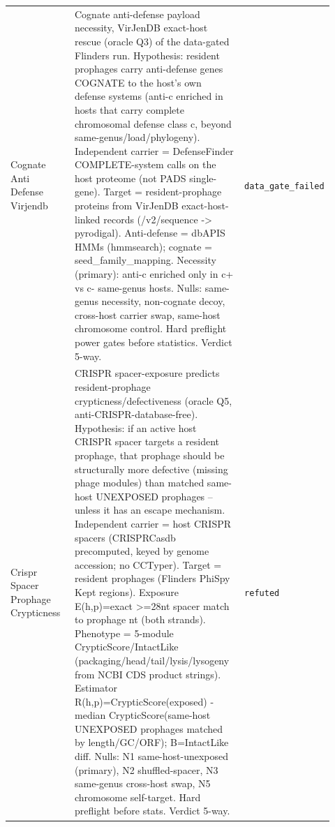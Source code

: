 \begin{longtable}{>{\raggedright\arraybackslash}p{0.22\linewidth}>{\raggedright\arraybackslash}p{0.55\linewidth}>{\raggedright\arraybackslash}p{0.15\linewidth}}
Cognate Anti Defense Virjendb & Cognate anti-defense payload necessity, VirJenDB exact-host rescue (oracle Q3) of the data-gated Flinders run. Hypothesis: resident prophages carry anti-defense genes COGNATE to the host's own defense systems (anti-c enriched in hosts that carry complete chromosomal defense class c, beyond same-genus/load/phylogeny). Independent carrier = DefenseFinder COMPLETE-system calls on the host proteome (not PADS single-gene). Target = resident-prophage proteins from VirJenDB exact-host-linked records (/v2/sequence -> pyrodigal). Anti-defense = dbAPIS HMMs (hmmsearch); cognate = seed\_family\_mapping. Necessity (primary): anti-c enriched only in c+ vs c- same-genus hosts. Nulls: same-genus necessity, non-cognate decoy, cross-host carrier swap, same-host chromosome control. Hard preflight power gates before statistics. Verdict 5-way. & \texttt{data\_gate\_failed} \\
Crispr Spacer Prophage Crypticness & CRISPR spacer-exposure predicts resident-prophage crypticness/defectiveness (oracle Q5, anti-CRISPR-database-free). Hypothesis: if an active host CRISPR spacer targets a resident prophage, that prophage should be structurally more defective (missing phage modules) than matched same-host UNEXPOSED prophages -- unless it has an escape mechanism. Independent carrier = host CRISPR spacers (CRISPRCasdb precomputed, keyed by genome accession; no CCTyper). Target = resident prophages (Flinders PhiSpy Kept regions). Exposure E(h,p)=exact >=28nt spacer match to prophage nt (both strands). Phenotype = 5-module CrypticScore/IntactLike (packaging/head/tail/lysis/lysogeny from NCBI CDS product strings). Estimator R(h,p)=CrypticScore(exposed) - median CrypticScore(same-host UNEXPOSED prophages matched by length/GC/ORF); B=IntactLike diff. Nulls: N1 same-host-unexposed (primary), N2 shuffled-spacer, N3 same-genus cross-host swap, N5 chromosome self-target. Hard preflight before stats. Verdict 5-way. & \texttt{refuted} \\

\end{longtable}
